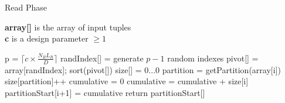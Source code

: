 \begin{algorithm}
\small
\caption{Read Phase}
\label{alg:read_phase}
\textbf{array[]} is the array of input tuples\\
\textbf{c} is a design parameter $\geq 1$\\
\begin{algorithmic}[1]
\State p = $\lceil c\times \frac{N_R L_R}{D} \rceil$
\State randIndex[] = generate $p-1$ random indexes
\State pivot[] = array[randIndex];
\State sort(pivot[])
\State size[] = {0...0}   
\State partition = getPartition(array[i]) 
\State size[partition]++ 
\EndFor
{}
\State cumulative = 0
\State cumulative = cumulative + size[i]
\State partitionStart[i+1] = cumulative
\EndFor
{}
\State return partitionStart[]
\end{algorithmic}

\end{algorithm}
